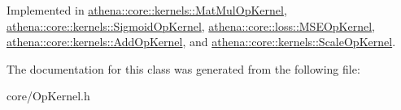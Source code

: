 Implemented in \mbox{\hyperlink{classathena_1_1core_1_1kernels_1_1_mat_mul_op_kernel_a3a397257c208f55ba5fba4018112a605}{athena\+::core\+::kernels\+::\+Mat\+Mul\+Op\+Kernel}}, \mbox{\hyperlink{classathena_1_1core_1_1kernels_1_1_sigmoid_op_kernel_abd929f41de55a4898a0fce70025c1499}{athena\+::core\+::kernels\+::\+Sigmoid\+Op\+Kernel}}, \mbox{\hyperlink{classathena_1_1core_1_1loss_1_1_m_s_e_op_kernel_a23aacffbbc73b177535511702f3c441d}{athena\+::core\+::loss\+::\+M\+S\+E\+Op\+Kernel}}, \mbox{\hyperlink{classathena_1_1core_1_1kernels_1_1_add_op_kernel_a687d68d7374e9546f01cefcbfb382d04}{athena\+::core\+::kernels\+::\+Add\+Op\+Kernel}}, and \mbox{\hyperlink{classathena_1_1core_1_1kernels_1_1_scale_op_kernel_ad1791a60026e90c95f248202e1404a26}{athena\+::core\+::kernels\+::\+Scale\+Op\+Kernel}}.



The documentation for this class was generated from the following file\+:\begin{DoxyCompactItemize}
\item 
core/Op\+Kernel.\+h\end{DoxyCompactItemize}
